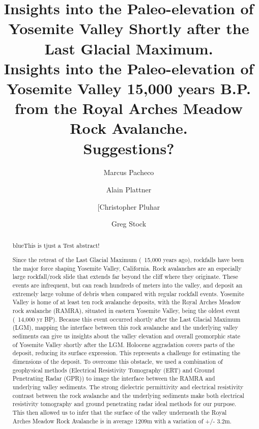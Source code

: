 \documentclass[5p]{elsarticle}
\newcommand{\COMON}{\begin{color}{blue}}
\newcommand{\COMOFF}{\end{color}}
\begin{document}
	\begin{frontmatter}

\title{Insights into the Paleo-elevation of Yosemite Valley Shortly after the Last Glacial Maximum.\\ \vspace{1cm}Insights into the Paleo-elevation of Yosemite Valley 15,000 years B.P. from the Royal Arches Meadow Rock Avalanche.\\ \vspace{1cm}Suggestions?}

\author[Marcus]{Marcus Pacheco}
\address[Marcus]{California State University, Fresno}

\author[Alain]{Alain Plattner}
\address[Alain]{University of Alabama}

\author[Chris]{[Christopher Pluhar}
\address[Chris]{California State University, Fresno}

\author[Greg]{Greg Stock}
\address[Greg]{Yosemite National Park}



										\begin{abstract}
										
\COMON This is tjust a Test abstract!\COMOFF Since the retreat of the Last Glacial Maximum (~15,000 years ago), rockfalls have been the major force shaping Yosemite Valley, California. Rock avalanches are an especially large rockfall/rock slide that extends far beyond the cliff where they originate. These events are infrequent, but can reach hundreds of meters into the valley, and deposit an extremely large volume of debris when compared with regular rockfall events. Yosemite Valley is home of at least ten rock avalanche deposits, with the Royal Arches Meadow rock avalanche (RAMRA), situated in eastern Yosemite Valley, being the oldest event (~14,000 yr BP). Because this event occurred shortly after the Last Glacial Maximum (LGM), mapping the interface between this rock avalanche and the underlying valley sediments can give us insights about the valley elevation and overall geomorphic state of Yosemite Valley shortly after the LGM.  Holocene aggradation covers parts of the deposit, reducing its surface expression. This represents a challenge for estimating the dimensions of the deposit. To overcome this obstacle, we used a combination of geophysical methods (Electrical Resistivity Tomography (ERT) and Ground Penetrating Radar (GPR)) to image the interface between the RAMRA and underlying valley sediments. The strong dielectric permittivity and electrical resistivity contrast between the rock avalanche and the underlying sediments make both electrical resistivity tomography and ground penetrating radar ideal methods for our purpose. This then allowed us to infer that the surface of the valley underneath the Royal Arches Meadow Rock Avalanche is in average 1209m with a variation of +/- 3.2m.


\end{abstract}
\end{frontmatter}
\end{document}
